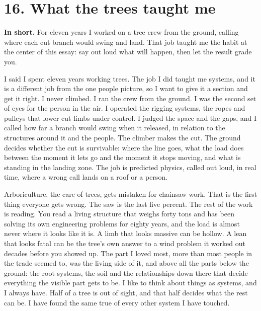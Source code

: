 \documentclass[11pt]{article}
\begin{document}
\section*{16. What the trees taught me}

\textbf{In short.} For eleven years I worked on a tree crew from the ground, calling where each cut branch would swing and land. That job taught me the habit at the center of this essay: say out loud what will happen, then let the result grade you.

I said I spent eleven years working trees. The job I did taught me systems, and it is a different job from the one people picture, so I want to give it a section and get it right. I never climbed. I ran the crew from the ground. I was the second set of eyes for the person in the air. I operated the rigging systems, the ropes and pulleys that lower cut limbs under control. I judged the space and the gaps, and I called how far a branch would swing when it released, in relation to the structures around it and the people. The climber makes the cut. The ground decides whether the cut is survivable: where the line goes, what the load does between the moment it lets go and the moment it stops moving, and what is standing in the landing zone. The job is predicted physics, called out loud, in real time, where a wrong call lands on a roof or a person.

Arboriculture, the care of trees, gets mistaken for chainsaw work. That is the first thing everyone gets wrong. The saw is the last five percent. The rest of the work is reading. You read a living structure that weighs forty tons and has been solving its own engineering problems for eighty years, and the load is almost never where it looks like it is. A limb that looks massive can be hollow. A lean that looks fatal can be the tree's own answer to a wind problem it worked out decades before you showed up. The part I loved most, more than most people in the trade seemed to, was the living side of it, and above all the parts below the ground: the root systems, the soil and the relationships down there that decide everything the visible part gets to be. I like to think about things as systems, and I always have. Half of a tree is out of sight, and that half decides what the rest can be. I have found the same true of every other system I have touched.
\end{document}
